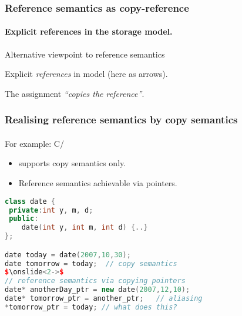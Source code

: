 \documentclass{beamer}
\newcommand{\Blue}[1]{\color{blue}#1\color{black}}
\begin{document}
\begin{frame}
\frametitle{Reference semantics as copy-reference}
\framesubtitle{Explicit references in the storage model.}

\Blue{Alternative viewpoint to reference semantics}
\medskip

Explicit \emph{references} in model (here as arrows). 

\bigskip

\begin{center}
\end{center}
\vfill

The assignment \emph{``copies the reference''}.

\end{frame}

\begin{frame}[fragile]
\frametitle{Realising reference semantics by copy semantics}
\framesubtitle{}
For example: C/\Cpp 
\begin{itemize}
\item \Cpp supports copy semantics only. 
\item Reference semantics achievable via pointers. 
\end{itemize}

\begin{lstlisting}[language=C++, colums=flexible, escapechar=\$]
class date {
 private:int y, m, d; 
 public:
    date(int y, int m, int d) {..}
};

date today = date(2007,10,30);
date tomorrow = today;  // copy semantics
$\onslide<2->$
// reference semantics via copying pointers
date* anotherDay_ptr = new date(2007,12,10);
date* tomorrow_ptr = another_ptr;   // aliasing
*tomorrow_ptr = today; // what does this?
\end{lstlisting}
\end{frame}
\end{document}
